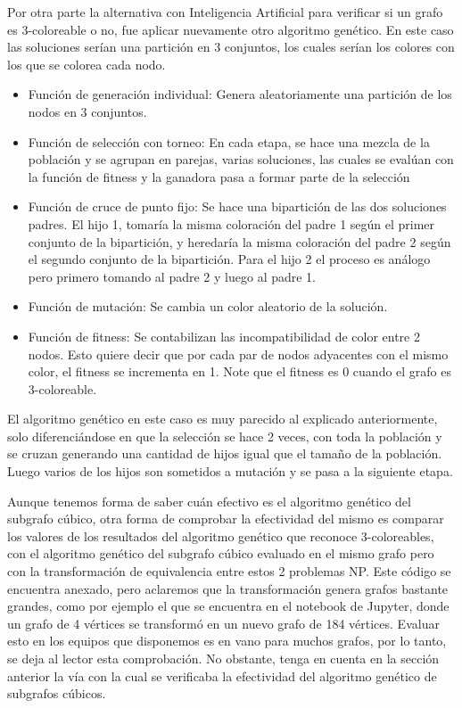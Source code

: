 \documentclass{article}
\begin{document}
Por otra parte la alternativa con Inteligencia Artificial para verificar si un grafo es 3-coloreable o no, fue aplicar nuevamente otro algoritmo genético. En este caso las soluciones serían una partición en 3 conjuntos, los cuales serían los colores con los que se colorea cada nodo.

\begin{itemize}
	\item Función de generación individual: Genera aleatoriamente una partición de los nodos en 3 conjuntos.
	\item Función de selección con torneo: En cada etapa, se hace una mezcla de la población y se agrupan en parejas, varias soluciones, las cuales se evalúan con la función de fitness y la ganadora pasa a formar parte de la selección
	\item Función de cruce de punto fijo: Se hace una bipartición de las dos soluciones padres. El hijo 1, tomaría la misma coloración del padre 1 según el primer conjunto de la bipartición, y heredaría la misma coloración del padre 2 según el segundo conjunto de la bipartición. Para el hijo 2 el proceso es análogo pero primero tomando al padre 2 y luego al padre 1.
	\item Función de mutación: Se cambia un color aleatorio de la solución.
	\item Función de fitness: Se contabilizan las incompatibilidad de color entre 2 nodos. Esto quiere decir que por cada par de nodos adyacentes con el mismo color, el fitness se incrementa en 1. Note que el fitness es 0 cuando el grafo es 3-coloreable.
\end{itemize}

El algoritmo genético en este caso es muy parecido al explicado anteriormente, solo diferenciándose en que la selección se hace 2 veces, con toda la población y se cruzan generando una cantidad de hijos igual que el tamaño de la población. Luego varios de los hijos son sometidos a mutación y se pasa a la siguiente etapa.

Aunque tenemos forma de saber cuán efectivo es el algoritmo genético del subgrafo cúbico, otra forma de comprobar la efectividad del mismo es comparar los valores de los resultados del algoritmo genético que reconoce 3-coloreables, con el algoritmo genético del subgrafo cúbico evaluado en el mismo grafo pero con la transformación de equivalencia entre estos 2 problemas NP. Este código se encuentra anexado, pero aclaremos que la transformación genera grafos bastante grandes, como por ejemplo el que se encuentra en el notebook de Jupyter, donde un grafo de 4 vértices se transformó en un nuevo grafo de 184 vértices. Evaluar esto en los equipos que disponemos es en vano para muchos grafos, por lo tanto, se deja al lector esta comprobación. No obstante, tenga en cuenta en la sección anterior la vía con la cual se verificaba la efectividad del algoritmo genético de subgrafos cúbicos.
\end{document}
